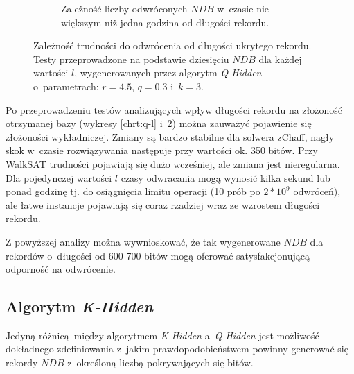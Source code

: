 \begin{figure}[!htb]
\begin{subfigure}{0.5\textwidth}
        \caption{Zależność liczby odwróconych $NDB$ w~czasie nie większym niż jedna godzina od długości rekordu.}
        \label{chrt:q-l1h}
    \end{subfigure}
    \caption{Zależność trudności do odwrócenia od długości ukrytego rekordu. Testy przeprowadzone na podstawie dziesięciu $NDB$ dla każdej wartości $l$, wygenerowanych przez algorytm \textit{Q-Hidden} o~parametrach:
        $r = 4.5$, $q = 0.3$ i~$k=3$.}
\end{figure}

Po przeprowadzeniu testów analizujących wpływ długości rekordu na złożoność otrzymanej bazy (wykresy \ref{chrt:q-l} i~\ref{chrt:q-l1h}) można zauważyć pojawienie się złożoności wykładniczej. Zmiany są bardzo stabilne dla solwera zChaff,
nagły skok w~czasie rozwiązywania następuje przy wartości ok. 350 bitów. Przy WalkSAT trudności pojawiają się dużo wcześniej, ale zmiana jest nieregularna. Dla pojedynczej wartości $l$ czasy odwracania mogą wynosić kilka sekund lub ponad godzinę tj.
do osiągnięcia limitu operacji (10 prób po $2*10^9$ odwróceń), ale łatwe instancje pojawiają się coraz rzadziej wraz ze wzrostem długości rekordu. 

Z powyższej analizy można wywnioskować, że tak wygenerowane $NDB$ dla rekordów o~długości od 600-700 bitów mogą oferować satysfakcjonującą odporność na odwrócenie. 

\pagebreak


\subsection{Algorytm \textit{K-Hidden}} \label{sec:test-k-hidden}

Jedyną różnicą między algorytmem \textit{K-Hidden} a~\textit{Q-Hidden} jest możliwość dokładnego zdefiniowania z~jakim prawdopodobieństwem powinny generować się rekordy $NDB$ z~określoną liczbą pokrywających się bitów.

